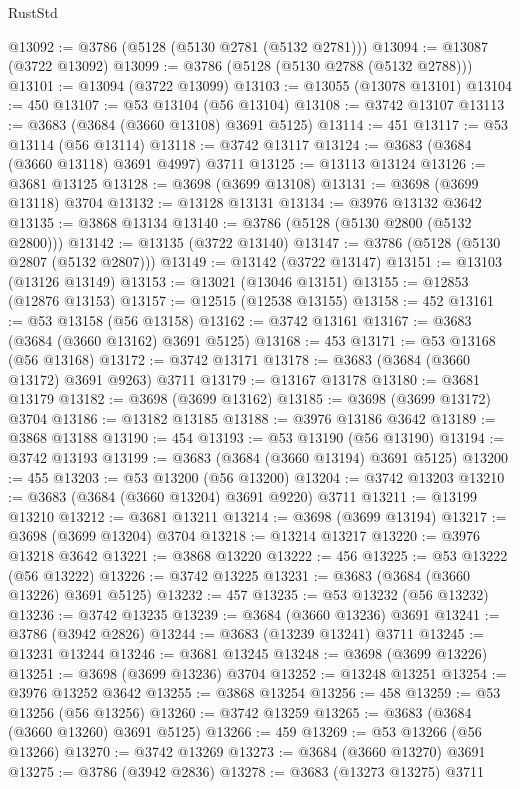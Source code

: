 \begin{lexlean}{RustStd}
\begin{coremodule}
{\begin{coremodule}
{{{{{{{{{{{{{{{{{{{{{{{{{{{{{{{{{{{{{{{{{{{{{{{@13092 := @3786 (@5128 (@5130 @2781 (@5132 @2781)))
@13094 := @13087 (@3722 @13092)
@13099 := @3786 (@5128 (@5130 @2788 (@5132 @2788)))
@13101 := @13094 (@3722 @13099)
@13103 := @13055 (@13078 @13101)
@13104 := 450
@13107 := @53 @13104 (@56 @13104)
@13108 := @3742 @13107
@13113 := @3683 (@3684 (@3660 @13108) @3691 @5125)
@13114 := 451
@13117 := @53 @13114 (@56 @13114)
@13118 := @3742 @13117
@13124 := @3683 (@3684 (@3660 @13118) @3691 @4997) @3711
@13125 := @13113 @13124
@13126 := @3681 @13125
@13128 := @3698 (@3699 @13108)
@13131 := @3698 (@3699 @13118) @3704
@13132 := @13128 @13131
@13134 := @3976 @13132 @3642
@13135 := @3868 @13134
@13140 := @3786 (@5128 (@5130 @2800 (@5132 @2800)))
@13142 := @13135 (@3722 @13140)
@13147 := @3786 (@5128 (@5130 @2807 (@5132 @2807)))
@13149 := @13142 (@3722 @13147)
@13151 := @13103 (@13126 @13149)
@13153 := @13021 (@13046 @13151)
@13155 := @12853 (@12876 @13153)
@13157 := @12515 (@12538 @13155)
@13158 := 452
@13161 := @53 @13158 (@56 @13158)
@13162 := @3742 @13161
@13167 := @3683 (@3684 (@3660 @13162) @3691 @5125)
@13168 := 453
@13171 := @53 @13168 (@56 @13168)
@13172 := @3742 @13171
@13178 := @3683 (@3684 (@3660 @13172) @3691 @9263) @3711
@13179 := @13167 @13178
@13180 := @3681 @13179
@13182 := @3698 (@3699 @13162)
@13185 := @3698 (@3699 @13172) @3704
@13186 := @13182 @13185
@13188 := @3976 @13186 @3642
@13189 := @3868 @13188
@13190 := 454
@13193 := @53 @13190 (@56 @13190)
@13194 := @3742 @13193
@13199 := @3683 (@3684 (@3660 @13194) @3691 @5125)
@13200 := 455
@13203 := @53 @13200 (@56 @13200)
@13204 := @3742 @13203
@13210 := @3683 (@3684 (@3660 @13204) @3691 @9220) @3711
@13211 := @13199 @13210
@13212 := @3681 @13211
@13214 := @3698 (@3699 @13194)
@13217 := @3698 (@3699 @13204) @3704
@13218 := @13214 @13217
@13220 := @3976 @13218 @3642
@13221 := @3868 @13220
@13222 := 456
@13225 := @53 @13222 (@56 @13222)
@13226 := @3742 @13225
@13231 := @3683 (@3684 (@3660 @13226) @3691 @5125)
@13232 := 457
@13235 := @53 @13232 (@56 @13232)
@13236 := @3742 @13235
@13239 := @3684 (@3660 @13236) @3691
@13241 := @3786 (@3942 @2826)
@13244 := @3683 (@13239 @13241) @3711
@13245 := @13231 @13244
@13246 := @3681 @13245
@13248 := @3698 (@3699 @13226)
@13251 := @3698 (@3699 @13236) @3704
@13252 := @13248 @13251
@13254 := @3976 @13252 @3642
@13255 := @3868 @13254
@13256 := 458
@13259 := @53 @13256 (@56 @13256)
@13260 := @3742 @13259
@13265 := @3683 (@3684 (@3660 @13260) @3691 @5125)
@13266 := 459
@13269 := @53 @13266 (@56 @13266)
@13270 := @3742 @13269
@13273 := @3684 (@3660 @13270) @3691
@13275 := @3786 (@3942 @2836)
@13278 := @3683 (@13273 @13275) @3711
}}}}}}}}}}}}}}}}}}}}}}}}}}}}}}}}}}}}}}}}}}}}}}}
\end{coremodule}}
\end{coremodule}
\end{lexlean}
